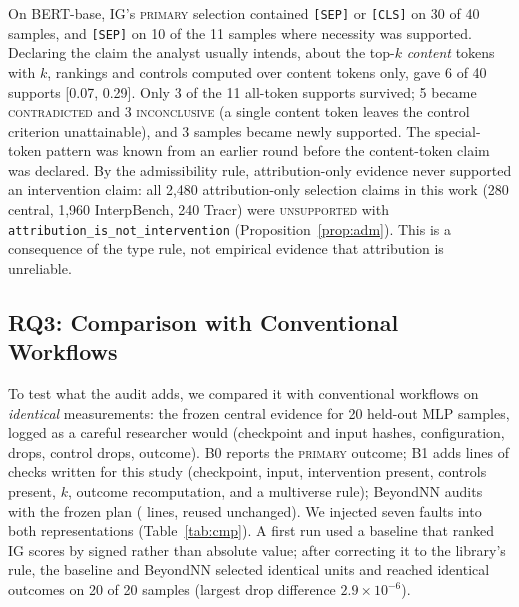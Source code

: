 On BERT-base, IG's \textsc{primary} selection contained \texttt{[SEP]} or \texttt{[CLS]} on 30 of 40 samples, and \texttt{[SEP]} on 10 of the 11 samples where necessity was supported. Declaring the claim the analyst usually intends, about the top-$k$ \emph{content} tokens with $k$, rankings and controls computed over content tokens only, gave 6 of 40 supports [0.07, 0.29]. Only 3 of the 11 all-token supports survived; 5 became \textsc{contradicted} and 3 \textsc{inconclusive} (a single content token leaves the control criterion unattainable), and 3 samples became newly supported. The special-token pattern was known from an earlier round before the content-token claim was declared. By the admissibility rule, attribution-only evidence never supported an intervention claim: all 2,480 attribution-only selection claims in this work (280 central, 1,960 InterpBench, 240 Tracr) were \textsc{unsupported} with \texttt{attribution\_is\_not\_intervention} (Proposition~\ref{prop:adm}). This is a consequence of the type rule, not empirical evidence that attribution is unreliable.

\subsection{RQ3: Comparison with Conventional Workflows}
\label{sec:res-cmp}

To test what the audit adds, we compared it with conventional workflows on \emph{identical} measurements: the frozen central evidence for 20 held-out MLP samples, logged as a careful researcher would (checkpoint and input hashes, configuration, drops, control drops, outcome). B0 reports the \textsc{primary} outcome; B1 adds \BOneLoc{} lines of checks written for this study (checkpoint, input, intervention present, controls present, $k$, outcome recomputation, and a multiverse rule); BeyondNN audits with the frozen plan (\PlanLoc{} lines, reused unchanged). We injected seven faults into both representations (Table~\ref{tab:cmp}). A first run used a baseline that ranked IG scores by signed rather than absolute value; after correcting it to the library's rule, the baseline and BeyondNN selected identical units and reached identical outcomes on 20 of 20 samples (largest drop difference $2.9\times10^{-6}$).

